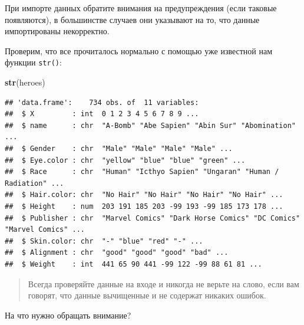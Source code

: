 \documentclass[]{book}
\newenvironment{Shaded}{\begin{snugshade}}{\end{snugshade}}
\newcommand{\KeywordTok}[1]{\textcolor[rgb]{0.13,0.29,0.53}{\textbf{#1}}}
\newcommand{\NormalTok}[1]{#1}
\begin{document}
При импорте данных обратите внимания на предупреждения (если таковые
появляются), в большинстве случаев они указывают на то, что данные
импортированы некорректно.

Проверим, что все прочиталось нормально с помощью уже известной нам
функции \texttt{str()}:

\begin{Shaded}
\begin{Highlighting}[]
\KeywordTok{str}\NormalTok{(heroes)}
\end{Highlighting}
\end{Shaded}

\begin{verbatim}
## 'data.frame':    734 obs. of  11 variables:
##  $ X         : int  0 1 2 3 4 5 6 7 8 9 ...
##  $ name      : chr  "A-Bomb" "Abe Sapien" "Abin Sur" "Abomination" ...
##  $ Gender    : chr  "Male" "Male" "Male" "Male" ...
##  $ Eye.color : chr  "yellow" "blue" "blue" "green" ...
##  $ Race      : chr  "Human" "Icthyo Sapien" "Ungaran" "Human / Radiation" ...
##  $ Hair.color: chr  "No Hair" "No Hair" "No Hair" "No Hair" ...
##  $ Height    : num  203 191 185 203 -99 193 -99 185 173 178 ...
##  $ Publisher : chr  "Marvel Comics" "Dark Horse Comics" "DC Comics" "Marvel Comics" ...
##  $ Skin.color: chr  "-" "blue" "red" "-" ...
##  $ Alignment : chr  "good" "good" "good" "bad" ...
##  $ Weight    : int  441 65 90 441 -99 122 -99 88 61 81 ...
\end{verbatim}

\begin{quote}
Всегда проверяйте данные на входе и никогда не верьте на слово, если вам
говорят, что данные вычищенные и не содержат никаких ошибок.
\end{quote}

На что нужно обращать внимание?
\end{document}
